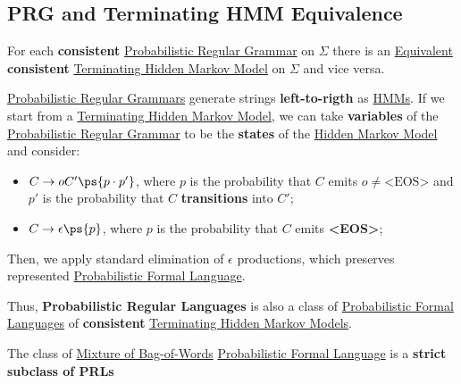 \subsection{PRG and Terminating HMM Equivalence}\label{sub:lm_prg_and_terminating_hmm_equivalence} %
For each \textbf{consistent} \hyperref[def:prg]{Probabilistic Regular Grammar} on $\Sigma$ there is an \hyperref[def:models-equiv]{Equivalent} \textbf{consistent} \hyperref[sub:lm_terminating_hidden_markov_models]{Terminating Hidden Markov Model} on $\Sigma$ and vice versa.
\begin{outerproof}{}{}
    \hyperref[def:prg]{Probabilistic Regular Grammars} generate strings \textbf{left-to-rigth} as \hyperref[def:hmm]{HMMs}.
    If we start from a \hyperref[sub:lm_terminating_hidden_markov_models]{Terminating Hidden Markov Model}, we can take \textbf{variables} of the \hyperref[def:prg]{Probabilistic Regular Grammar} to be the \textbf{states} of the \hyperref[def:hmm]{Hidden Markov Model} and consider:
    \begin{itemize}
        \item $C\to oC'\ps{p \cdot p'}$, where $p$ is the probability that $C$ emits $o\neq \text{<EOS>}$ and $p'$ is the probability that $C$ \textbf{transitions} into $C'$;
        \item $C\to \epsilon \ps{p}$, where $p$ is the probability that $C$ emits \textbf{<EOS>};
    \end{itemize}
    Then, we apply standard elimination of $\epsilon$ productions, which preserves represented \hyperref[def:pfl]{Probabilistic Formal Language}.
\end{outerproof}
Thus, \textbf{Probabilistic Regular Languages} is also a class of \hyperref[def:pfl]{Probabilistic Formal Languages} of \textbf{consistent} \hyperref[sub:lm_terminating_hidden_markov_models]{Terminating Hidden Markov Models}.
\begin{note}
    The class of \hyperref[sub:lm_mixture_of_bag_of_words]{Mixture of Bag-of-Words} \hyperref[def:pfl]{Probabilistic Formal Language} is a \textbf{strict subclass of PRLs}
\end{note}
